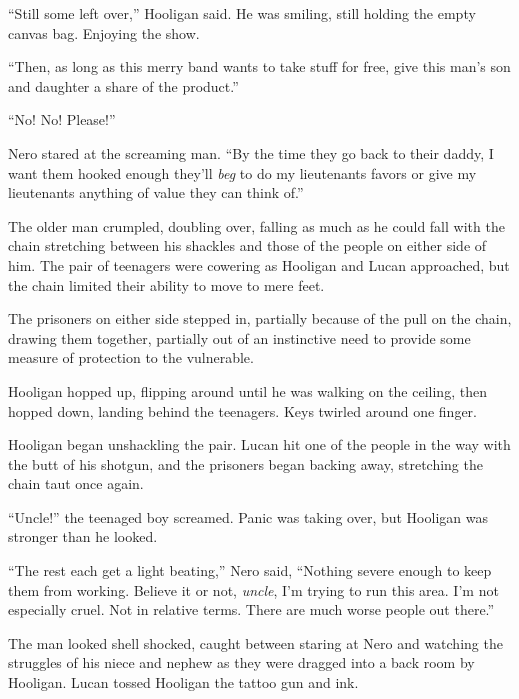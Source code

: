 ``Still some left over,'' Hooligan said.  He was smiling, still holding the empty canvas bag.  Enjoying the show.



``Then, as long as this merry band wants to take stuff for free, give this man's son and daughter a share of the product.''



``No!  No!  Please!''



Nero stared at the screaming man.  ``By the time they go back to their daddy, I want them hooked enough they'll \emph{beg} to do my lieutenants favors or give my lieutenants anything of value they can think of.''



The older man crumpled, doubling over, falling as much as he could fall with the chain stretching between his shackles and those of the people on either side of him.  The pair of teenagers were cowering as Hooligan and Lucan approached, but the chain limited their ability to move to mere feet.



The prisoners on either side stepped in, partially because of the pull on the chain, drawing them together, partially out of an instinctive need to provide some measure of protection to the vulnerable.



Hooligan hopped up, flipping around until he was walking on the ceiling, then hopped down, landing behind the teenagers.  Keys twirled around one finger.



Hooligan began unshackling the pair.  Lucan hit one of the people in the way with the butt of his shotgun, and the prisoners began backing away, stretching the chain taut once again.



``Uncle!'' the teenaged boy screamed.  Panic was taking over, but Hooligan was stronger than he looked.



``The rest each get a light beating,'' Nero said, ``Nothing severe enough to keep them from working.  Believe it or not, \emph{uncle}, I'm trying to run this area.  I'm not especially cruel.  Not in relative terms.  There are much worse people out there.''



The man looked shell shocked, caught between staring at Nero and watching the struggles of his niece and nephew as they were dragged into a back room by Hooligan.  Lucan tossed Hooligan the tattoo gun and ink.



